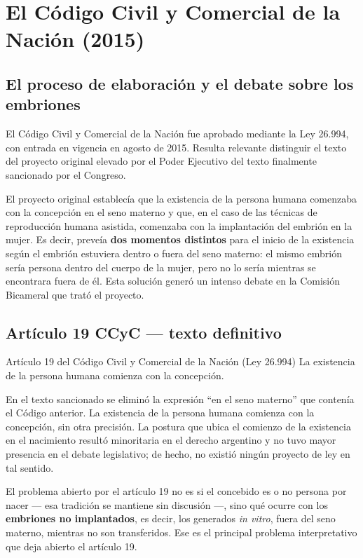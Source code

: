 \documentclass[12pt,oneside]{book}
\begin{document}
\section{El Código Civil y Comercial de la Nación (2015)}

\subsection{El proceso de elaboración y el debate sobre los embriones}

El Código Civil y Comercial de la Nación fue aprobado mediante la Ley 26.994, con entrada en vigencia en agosto de 2015. Resulta relevante distinguir el texto del proyecto original elevado por el Poder Ejecutivo del texto finalmente sancionado por el Congreso.

\begin{important}
El proyecto original establecía que la existencia de la persona humana comenzaba con la concepción en el seno materno y que, en el caso de las técnicas de reproducción humana asistida, comenzaba con la implantación del embrión en la mujer. Es decir, preveía \textbf{dos momentos distintos} para el inicio de la existencia según el embrión estuviera dentro o fuera del seno materno: el mismo embrión sería persona dentro del cuerpo de la mujer, pero no lo sería mientras se encontrara fuera de él. Esta solución generó un intenso debate en la Comisión Bicameral que trató el proyecto.
\end{important}

\subsection{Artículo 19 CCyC --- texto definitivo}

\begin{definition}{Artículo 19 del Código Civil y Comercial de la Nación (Ley 26.994)}
La existencia de la persona humana comienza con la concepción.
\end{definition}

En el texto sancionado se eliminó la expresión ``en el seno materno'' que contenía el Código anterior. La existencia de la persona humana comienza con la concepción, sin otra precisión. La postura que ubica el comienzo de la existencia en el nacimiento resultó minoritaria en el derecho argentino y no tuvo mayor presencia en el debate legislativo; de hecho, no existió ningún proyecto de ley en tal sentido.

\begin{important}
El problema abierto por el artículo 19 no es si el concebido es o no persona por nacer --- esa tradición se mantiene sin discusión ---, sino qué ocurre con los \textbf{embriones no implantados}, es decir, los generados \textit{in vitro}, fuera del seno materno, mientras no son transferidos. Ese es el principal problema interpretativo que deja abierto el artículo 19.
\end{important}
\end{document}
